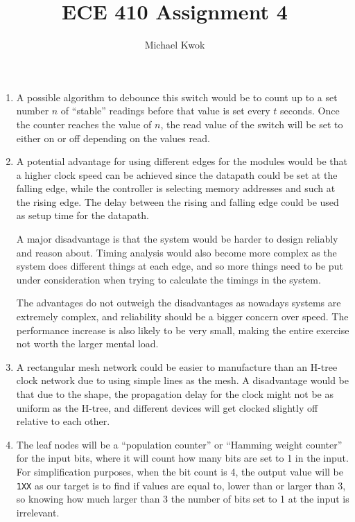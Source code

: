 \documentclass{article}
\title{ECE 410 Assignment 4}
\author{Michael Kwok}
\begin{document}
\maketitle

\begin{enumerate}
  \item A possible algorithm to debounce this switch would be to count up to a set number \(n\) of ``stable'' readings before that value is set every \(t\) seconds. Once the counter reaches the value of \(n\), the read value of the switch will be set to either on or off depending on the values read.
   
  \item A potential advantage for using different edges for the modules would be that a higher clock speed can be achieved since the datapath could be set at the falling edge, while the controller is selecting memory addresses and such at the rising edge. The delay between the rising and falling edge could be used as setup time for the datapath.
  
  A major disadvantage is that the system would be harder to design reliably and reason about. Timing analysis would also become more complex as the system does different things at each edge, and so more things need to be put under consideration when trying to calculate the timings in the system.

  The advantages do not outweigh the disadvantages as nowadays systems are extremely complex, and reliability should be a bigger concern over speed. The performance increase is also likely to be very small, making the entire exercise not worth the larger mental load.

  \item A rectangular mesh network could be easier to manufacture than an H-tree clock network due to using simple lines as the mesh. A disadvantage would be that due to the shape, the propagation delay for the clock might not be as uniform as the H-tree, and different devices will get clocked slightly off relative to each other.
  
  \item The leaf nodes will be a ``population counter'' or ``Hamming weight counter'' for the input bits, where it will count how many bits are set to 1 in the input. For simplification purposes, when the bit count is 4, the output value will be \verb|1XX| as our target is to find if values are equal to, lower than or larger than 3, so knowing how much larger than 3 the number of bits set to 1 at the input is irrelevant.
  

\end{enumerate}
\end{document}
